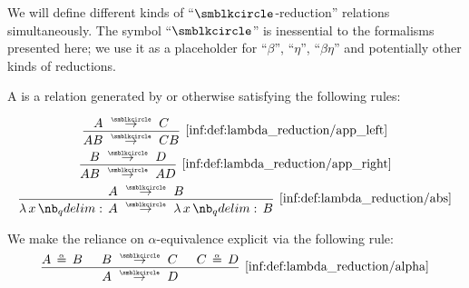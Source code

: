 \begin{definition}\label{def:lambda_reduction}
  We will define different kinds of \enquote{\( {\anon} \)-reduction} relations simultaneously. The symbol \enquote{\( {\anon} \)} is inessential to the formalisms presented here; we use it as a placeholder for \enquote{\( \beta \)}, \enquote{\( \eta \)}, \enquote{\( \beta\eta \)} and potentially other kinds of reductions.

  \begin{thmenum}
     A  is a relation generated by or otherwise satisfying the following rules:
    \begin{ThreeColumns}
      \begin{equation*}\taglabel[\ensuremath{ \logic{App}_{\anon}^L }]{inf:def:lambda_reduction/app_left}
        \begin{prooftree}
          \hypo{ A \pred C }
          \infer1[\ref{inf:def:lambda_reduction/app_left}]{ AB \pred CB }
        \end{prooftree}
      \end{equation*}
    \BeginSecondColumn
      \begin{equation*}\taglabel[\ensuremath{ \logic{App}_{\anon}^R }]{inf:def:lambda_reduction/app_right}
        \begin{prooftree}
          \hypo{ B \pred D }
          \infer1[\ref{inf:def:lambda_reduction/app_right}]{ AB \pred AD }
        \end{prooftree}
      \end{equation*}
    \BeginThirdColumn
      \begin{equation*}\taglabel[\ensuremath{ \logic{Abs}_{\anon} }]{inf:def:lambda_reduction/abs}
        \begin{prooftree}
          \hypo{ A \pred B }
          \infer1[\ref{inf:def:lambda_reduction/abs}]{ \qabs x A \pred \qabs x B }
        \end{prooftree}
      \end{equation*}
    \end{ThreeColumns}

    We make the reliance on \( \alpha \)-equivalence explicit via the following rule:
    \begin{equation*}\taglabel[\ensuremath{ \logic{Alpha}_{\anon} }]{inf:def:lambda_reduction/alpha}
      \begin{prooftree}
        \hypo{ A \aequiv B }
        \hypo{ B \pred C }
        \hypo{ C \aequiv D }
        \infer3[\ref{inf:def:lambda_reduction/alpha}]{ A \pred D }.
      \end{prooftree}
    \end{equation*}


\end{thmenum}
\end{definition}
